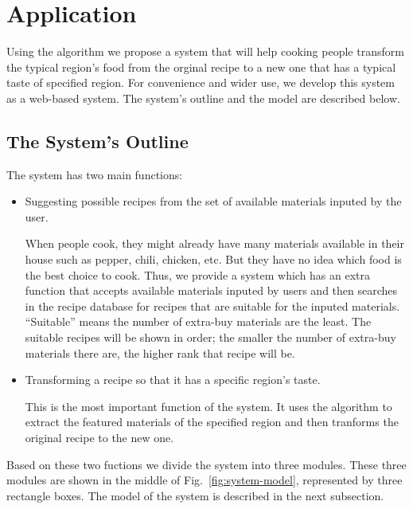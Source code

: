\chapter{Application}\label{chap:evaluation}
Using the algorithm we propose a system that will help cooking people transform the typical region's food from the orginal recipe to a new one that has a typical taste of specified region. For convenience and wider use, we develop this system as a web-based system. The system's outline and the model are described below.  

\section{The System's Outline} 

The system has two main functions:

\begin{itemize}

\item Suggesting possible recipes from the set of available materials inputed by the user. 

When people cook, they might already have many materials available in their house such as pepper, chili, chicken, etc. But they have no idea which food is the best choice to cook. Thus, we provide a system which has an extra function that accepts available materials inputed by users and then searches in the recipe database for recipes that are suitable for the inputed materials. ``Suitable'' means the number of extra-buy materials are the least. The suitable recipes will be shown in order; the smaller the number of extra-buy materials there are, the higher rank that recipe will be.

\item Transforming a recipe so that it has a specific region's taste. 

This is the most important function of the system. It uses the algorithm to extract the featured materials of the specified region and then tranforms the original recipe to the new one. 
\end{itemize}

Based on these two fuctions we divide the system into three modules. These three modules are shown in the middle of Fig.~\ref{fig:system-model}, represented by three rectangle boxes. The model of the system is described in the next subsection.
 
